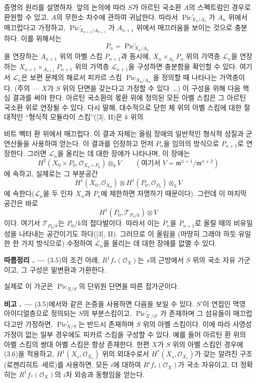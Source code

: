 \documentclass[11pt,twoside,openany]{book}
\numberwithin{equation}{section}
\newcommand{\sourceunit}{front}
\newcommand{\src}[1]{%
  \phantomsection\hypertarget{src:\sourceunit:#1}{}%
  \marginpar{\raggedleft\footnotesize\sffamily #1}%
}
\theoremstyle{plain}
\theoremstyle{definition}
\theoremstyle{remark}
\newcommand{\result}[2]{%
  \par\medskip\noindent\textbf{#1%
  \if\relax\detokenize{#2}\relax\else\space#2\fi. ---}\enspace
}
\begin{document}
증명의 원리를 설명하자. 앞의 논의에 따라 $S$가 아르틴 국소환 $A$의
스펙트럼인 경우로 환원할 수 있고, $A$의 무한소 차수에 관하여 귀납한다.
따라서 $\operatorname{Pic}_{X_n/A_n}^\circ$가 $A_n$ 위에서 매끄럽다고
가정하고, $\operatorname{Pic}_{X_{n+1}/A_{n+1}}^\circ$가 $A_{n+1}$ 위에서
매끄러움을 보이는 것으로 충분하다. 이를 위해서는
\[
P_n=\operatorname{Pic}_{X_n/A_n}^\circ
\]
을 연장하는 $A_{n+1}$ 위의 아벨 스킴 $P_{n+1}$과 동시에,
$X_n\times_{A_n}P_n$ 위의 가역층 $\mathcal L_n$을 연장하는
$X_{n+1}\times_{A_{n+1}}P_{n+1}$ 위의 가역층 $\mathcal L_{n+1}$을
구성하면 충분함을 확인할 수 있다. 여기서 $\mathcal L_n$은 보편 문제의
해로서 피카르 스킴 $\operatorname{Pic}_{X_n/A_n}$을 정의할 때 나타나는
가역층이다. (주의 --- $X$가 $S$ 위의 단면을 갖는다고 가정할 수 있다~\ldots)
이 구성을 위해 다음 핵심 결과를 써야 한다. 아르틴 국소환의 몫환 위에
정의된 모든 아벨 스킴은 그 아르틴 국소환 위로 연장될 수 있다. 다시 말해,
대수적으로 닫힌 체 위의 아벨 스킴에 대한 절대적인 ``형식적 모듈라이
스킴''([3], II)은 $k$ 위의

\src{240}
비트 벡터 환 위에서 매끄럽다. 이 결과 자체는
올림 장애의 일반적인 형식적 성질과 군 연산들을 사용하여 얻는다. 이 결과를
인정하고 먼저 $P_n$을 임의의 방식으로 $P_{n+1}$로 연장한다. 그러면
$\mathcal L_n$을 올리는 데 대한 장애가 나타나며, 이 장애는
\[
H^2(X_0\times P_0,\mathcal O_{X_0\times P_0})\otimes_k V
\qquad(\text{여기서 }V=\mathfrak m^{n+1}/\mathfrak m^{n+2})
\]
에 속하고, 실제로는 그 부분공간
\[
H^1(X_0,\mathcal O_{X_0})\otimes
H^1(P_0,\mathcal O_{P_0})\otimes_k V
\]
에 속한다($\mathcal L_n$을 두 인자 $X_n$과 $P_n$에 제한하면 자명하기
때문이다). 그런데 이 마지막 공간은 바로
\[
H^1(P_0,\mathcal T_{P_0/k})\otimes V
\]
이다. 여기서 $\mathcal T_{P_0/k}$는 $P_0/k$의 접다발이다. 따라서 이는
$P_n$을 $P_{n+1}$로 올릴 때의 비유일성을 나타내는 공간이기도 하다([3],
II). 그러므로 이 올림을 (마땅히 그래야 하듯 유일한 한 가지 방식으로)
수정하여 $\mathcal L_n$을 올리는 데 대한 장애를 없앨 수 있다.

\result{따름정리}{3.6} (3.5)의 조건 아래,
$R^1f_*(\mathcal O_X)$는 $s$의 근방에서 $S$ 위의 국소 자유 가군이고,
그 구성은 밑변환과 가환한다.

실제로 이 가군은 $\operatorname{Pic}_{X/S}$의 단위원 단면을 따른
접가군이다.

\result{비고}{3.7} (3.5)에서와 같은 논증을 사용하면 다음을 보일 수 있다.
$S'$이 연접인 멱영 아이디얼층으로 정의되는 $S$의 부분스킴이고,
$\operatorname{Pic}_{X'/S'}^\circ$가 존재하며 그 섬유들이 매끄럽다고만
가정하면, $\operatorname{Pic}_{X/S}^\circ$는 반드시 존재하며 $S$ 위의
아벨 스킴이다. 이에 따라 사영성 가정이 없는 일부 경우에도 피카르 스킴을
구성할 수 있다. 예를 들어 아르틴 환 위의 아벨 스킴의 쌍대 아벨 스킴은
항상 존재한다. 한편 $X$가 $S$ 위의 아벨 스킴인 경우에 (3.6)을 적용하고,
$H^1(X_s,\mathcal O_{X_s})$ 위의 외대수로서
$H^*(X_s,\mathcal O_{X_s})$가 갖는 알려진 구조(로젠리히트--세르)를
사용하면, 모든 $i$에 대하여 $R^if_*(\mathcal O_X)$가 국소 자유이고,
더 정확히는 $R^1f_*(\mathcal O_X)$의 $i$차 외승과 동형임을 얻는다.
\end{document}
